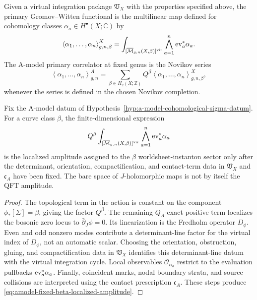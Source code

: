 \begin{definition}
Given a virtual integration package \(\mathfrak V_X\) with the properties
specified above, the primary Gromov--Witten functional is the multilinear map
defined for cohomology classes \(\alpha_a\in H^\bullet(X;\mathbb C)\) by
\[
  \left\langle \alpha_1,\ldots,\alpha_n\right\rangle_{g,n,\beta}^{X}
  =
  \int_{[\overline{\mathcal M}_{g,n}(X,\beta)]^{\rm vir}}
  \bigwedge_{a=1}^n {\rm ev}_a^\ast\alpha_a .
\]
The A-model primary correlator at fixed genus is the Novikov series
\[
  \left\langle \alpha_1,\ldots,\alpha_n\right\rangle_{g,n}^{A}
  =
  \sum_{\beta\in H_2(X;\mathbb Z)}
  Q^\beta
  \left\langle \alpha_1,\ldots,\alpha_n\right\rangle_{g,n,\beta}^{X},
\]
whenever the series is defined in the chosen Novikov completion.
\end{definition}

\begin{proposition}
\label{prop:amodel-worldsheet-instanton-amplitude-datum}
Fix the A-model datum of
Hypothesis~\ref{hyp:a-model-cohomological-sigma-datum}.  For a curve class
\(\beta\), the finite-dimensional expression
\begin{equation}
  Q^\beta
  \int_{[\overline{\mathcal M}_{g,n}(X,\beta)]^{\rm vir}}
  \bigwedge_{a=1}^n{\rm ev}_a^\ast\alpha_a
  \label{eq:amodel-fixed-beta-localized-amplitude}
\end{equation}
is the localized amplitude assigned to the \(\beta\) worldsheet-instanton
sector only after the determinant, orientation, compactification, and
contact-term data in \(\mathfrak V_X\) and \(\mathfrak c_A\) have been fixed.
The bare space of \(J\)-holomorphic maps is not by itself the QFT amplitude.
\end{proposition}

\begin{proof}
The topological term in the action is constant on the component
\(\phi_\ast[\Sigma]=\beta\), giving the factor \(Q^\beta\).  The remaining
\(Q_A\)-exact positive term localizes the bosonic zero locus to
\(\bar\partial_J\phi=0\).  Its linearization is the Fredholm operator
\(D_\phi\).  Even and odd nonzero modes contribute a determinant-line factor
for the virtual index of \(D_\phi\), not an automatic scalar.  Choosing the
orientation, obstruction, gluing, and compactification data in
\(\mathfrak V_X\) identifies this determinant-line datum with the virtual
integration cycle.  Local observables \(\mathcal O_{\alpha_a}\) restrict to
the evaluation pullbacks \({\rm ev}_a^\ast\alpha_a\).  Finally, coincident
marks, nodal boundary strata, and source collisions are interpreted using the
contact prescription \(\mathfrak c_A\).  These steps produce
\eqref{eq:amodel-fixed-beta-localized-amplitude}.
\end{proof}

